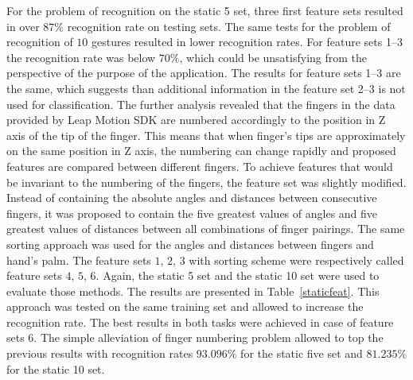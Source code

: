 For the problem of recognition on the static 5 set, three first feature sets resulted in over $87\%$ recognition rate on testing sets.
The same tests for the problem of recognition of $10$ gestures resulted in lower recognition rates.
For feature sets 1--3 the recognition rate was below $70\%$, which could be unsatisfying from the perspective of the purpose of the application.
The results for feature sets 1--3 are the same, which suggests than additional information in the feature set 2--3 is not used for classification.  
The further analysis revealed that the fingers in the data provided by Leap Motion SDK are numbered accordingly to the position in Z axis of the tip of the finger.
This means that when finger's tips are approximately on the same position in Z axis, the numbering can change rapidly and proposed features are compared between different fingers.
To achieve features that would be invariant to the numbering of the fingers, the feature set was slightly modified.
Instead of containing the absolute angles and distances between consecutive fingers, it was proposed to contain the five greatest values of angles and five greatest values of distances between all combinations of finger pairings.
The same sorting approach was used for the angles and distances between fingers and hand's palm.
The feature sets $1$, $2$, $3$ with sorting scheme were respectively called feature sets $4$, $5$, $6$.
Again, the static 5 set and the static 10 set were used to evaluate those methods. 
The results are presented in Table~\ref{staticfeat}.
This approach was tested on the same training set and allowed to increase the recognition rate.
The best results in both tasks were achieved in case of feature sets $6$.
The simple alleviation of finger numbering problem allowed to top the previous results with recognition rates $93.096\%$ for the static five set and $81.235\%$ for the static 10 set. 

